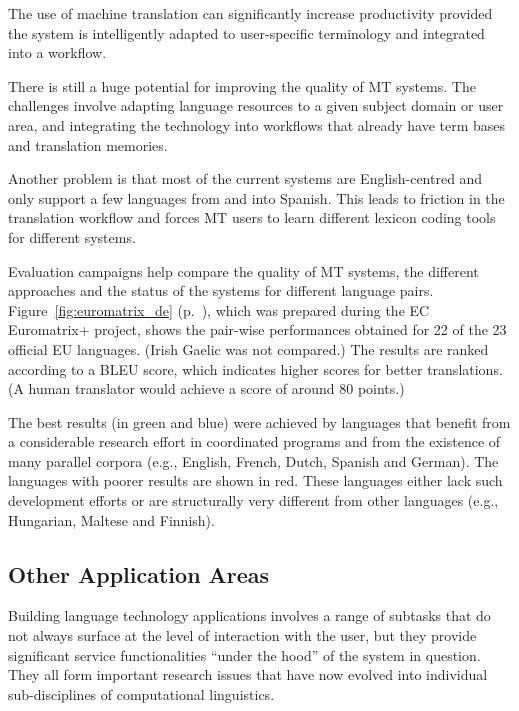 \begin{multicols}{2}

The use of machine translation can significantly increase productivity provided the system is intelligently adapted to user-specific terminology and integrated into a workflow. 

There is still a huge potential for improving the quality of MT systems. The challenges involve adapting language resources to a given subject domain or user area, and integrating the technology into workflows that already have term bases and translation memories.

Another problem is that most of the current systems are English-centred and only support a few languages from and into Spanish. This leads to friction in the translation workflow and forces MT users to learn different lexicon coding tools for different systems.

Evaluation campaigns help compare the quality of MT systems, the different approaches and the status of the systems for different language pairs. Figure~\ref{fig:euromatrix_de} (p.~\pageref{fig:euromatrix_de}), which was prepared during the EC Euromatrix+ project, shows the pair-wise performances obtained for 22 of the 23 official EU languages. (Irish Gaelic was not compared.) The results are ranked according to a BLEU score, which indicates higher scores for better translations.\cite{bleu1} (A human translator would achieve a score of around 80 points.) 

The best results (in green and blue) were achieved by languages that benefit from a considerable research effort in coordinated programs and from the existence of many parallel corpora (e.g., English, French, Dutch, Spanish and German). The languages with poorer results are shown in red. These languages either lack such development efforts or are structurally very different from other languages (e.g., Hungarian, Maltese and Finnish).

\subsection{Other Application Areas}


Building language technology applications involves a range of subtasks that do not always surface at the level of interaction with the user, but they provide significant service functionalities “under the hood” of the system in question. They all form important research issues that have now evolved into individual sub-disciplines of computational linguistics. 


\end{multicols}
